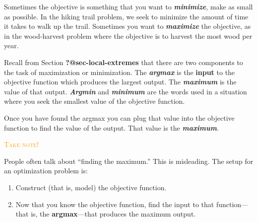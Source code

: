 \documentclass[
  letterpaper,
  DIV=11,
  numbers=noendperiod,
  oneside]{scrreprt}
\providecommand{\tightlist}{%
  \setlength{\itemsep}{0pt}\setlength{\parskip}{0pt}}
\newenvironment{takenote}%
{%
\textcolor{orange}{\hrulefill}%
  \par\vspace{.3\baselineskip}%
  \textcolor{orange}{\scshape Take note!}%
  \par\vspace{\baselineskip}%
}%
{\textcolor{orange}{\hrulefill}}
\begin{document}
Sometimes the objective is something that you want to
\textbf{\emph{minimize}}, make as small as possible. In the hiking trail
problem, we seek to minimize the amount of time it takes to walk up the
trail. Sometimes you want to \textbf{\emph{maximize}} the objective, as
in the wood-harvest problem where the objective is to harvest the most
wood per year.


Recall from Section \textbf{?@sec-local-extremes} that there are two
components to the task of maximization or minimization. The
\textbf{\emph{argmax}} is the \textbf{input} to the objective function
which produces the largest output. The \textbf{\emph{maximum}} is the
value of that output. \textbf{\emph{Argmin}} and
\textbf{\emph{minimum}} are the words used in a situation where you seek
the smallest value of the objective function.

Once you have found the argmax you can plug that value into the
objective function to find the value of the output. That value is the
\textbf{\emph{maximum}}.

\begin{takenote}

People often talk about ``finding the maximum.'' This is misleading. The
setup for an optimization problem is:

\begin{enumerate}
\def\labelenumi{\arabic{enumi}.}
\tightlist
\item
  Construct (that is, model) the objective function.
\item
  Now that you know the objective function, find the input to that
  function---that is, the \textbf{argmax}---that produces the maximum
  output.
\end{enumerate}

\end{takenote}
\end{document}
